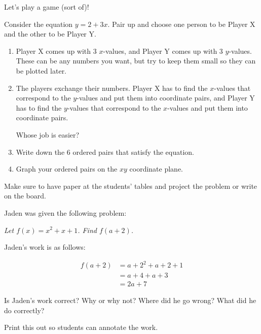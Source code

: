 \documentclass[noauthor,noinstructornotes]{ximera}
\begin{document}
\begin{problem}
Let's play a game (sort of)!

Consider the equation \(y = 2 + 3x\). Pair up and 
    choose one person to be Player X and the other
    to be Player Y.
    \begin{enumerate}
        \item Player X comes up with 3 \(x\)-values, and 
        Player Y comes up with 3 \(y\)-values. 
        These can be any numbers you want, but try 
        to keep them small so they can be plotted 
        later.
        \item The players exchange their numbers. 
        Player X has to find the \(x\)-values that 
        correspond to the \(y\)-values and put 
        them into coordinate pairs, and Player Y 
        has to find the \(y\)-values that 
        correspond to the \(x\)-values and put 
        them into coordinate pairs. 
        
        Whose job is easier?
        
        \item Write down the 6 
        ordered pairs that satisfy the equation.
        \item Graph your ordered pairs on the \(xy\)
        coordinate plane.
    \end{enumerate}


\begin{instructorNotes}
Make sure to have paper at the students' tables and project
the problem or write on the board.
\end{instructorNotes}
\end{problem}

\begin{problem}
Jaden was given the following problem:

\textit{Let \(f(x) = x^2 + x + 1\). Find \(f(a + 2)\).}

Jaden's work is as follows:

\begin{align*}
    f(a + 2) & = a + 2^2 + a + 2 + 1 \\
    & = a + 4 + a + 3 \\
    & = 2a + 7
\end{align*}

Is Jaden's work correct? Why or why not? Where did he 
go wrong? What did he do correctly?

\begin{instructorNotes}
Print this out so students can annotate the work.
\end{instructorNotes}
\end{problem}
\end{document}
